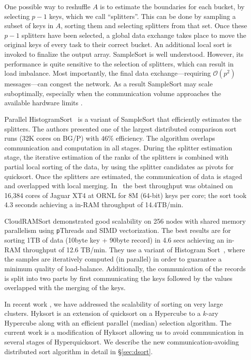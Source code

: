 One possible way to reshuffle $A$ is to estimate the boundaries for each bucket, by selecting $p-1$ keys, which we call
``splitters''. This can be done  by sampling a
subset of keys in $A$, sorting them and selecting splitters from that set. Once these $p-1$ splitters have been
selected, a global data exchange takes place to move the original keys of every task to their correct bucket.
An additional local sort is invoked to finalize the output array. SampleSort is well understood. However, its performance is quite sensitive to the selection of splitters, which can result in load imbalance. Most importantly, the final data exchange---requiring $\mathcal{O}(p^2)$ messages---can congest the network. As a result SampleSort may scale 
suboptimally, especially when the communication volume approaches the available hardware limits \cite{hyksort}.

Parallel HistogramSort~\cite{kale93,solomonik10} is
a variant of SampleSort that efficiently estimates the splitters. The authors presented
one of the largest distributed comparison sort runs (32K cores on
BG/P) with $46\%$ efficiency. The algorithm overlaps communication
and computation in all stages. During the splitter estimation
stage, the iterative estimation of the ranks of the splitters is
combined with partial local sorting of the data, by using the
splitter candidates as pivots for quicksort. Once the splitters
are estimated, the communication of data is staged and overlapped
with local merging. In~\cite{solomonik10} the best throughput was
obtained on 16,384 cores of Jaguar XT4 at ORNL for 8M (64-bit) keys
per core; the sort took 4.3 seconds achieving a in-RAM throughput of
14.4TB/min. 

CloudRAMSort \cite{kim12} demonstrated good scalability on 256 nodes with shared memory
parallelism using {\texttt pThreads} and SIMD vectorization. The
best results are for sorting 1TB of data (10byte key + 90byte
record) in 4.6 secs achieving an in-RAM throughput of 12.6 TB/min. They
use a variant of Histogram Sort~\cite{kale93}, where the
samples are iteratively computed (in parallel) in order to guarantee
a minimum quality of load-balance. Additionally, the communication of the records is split into two parts by first communicating the keys followed by the values overlapped with the merging of the keys. 

In recent work \cite{hyksort}, we have addressed the scalability of sorting on very large clusters. Hyksort\cite{hyksort} is an extension of quicksort on a Hypercube \cite{wagar87} to a $k$-ary Hypercube along with an efficient parallel (median) selection algorithm. The current work is a modification of Hyksort\cite{hyksort} allowing
us to avoid communication in several stages of Hyperquicksort. We describe the new communication-avoiding distributed sort algorithm in detail in \S\ref{sec:dsort}.

